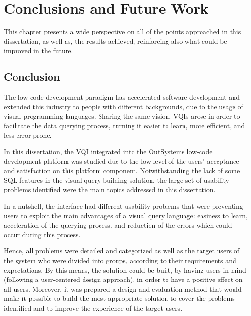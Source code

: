

\chapter{Conclusions and Future Work}
\label{cha:conclusions_and_future_work}

This chapter presents a wide perspective on all of the points approached in this dissertation, as well as, the results achieved, reinforcing also what could be improved in the future.

\section{Conclusion}
\label{sec:conclusion}

The low-code development paradigm has accelerated software development and extended this industry to people with different backgrounds, due to the usage of visual programming languages. Sharing the same vision, \glspl{VQI} arose in order to facilitate the data querying process, turning it easier to learn, more efficient, and less error-prone.

In this dissertation, the \gls{VQI} integrated into the OutSystems low-code development platform was studied due to the low level of the users' acceptance and satisfaction on this platform component. Notwithstanding the lack of some \gls{SQL} features in the visual query building solution, the large set of usability problems identified were the main topics addressed in this dissertation.

In a nutshell, the interface had different usability problems that were preventing users to exploit the main advantages of a visual query language: easiness to learn, acceleration of the querying process, and reduction of the errors which could occur during this process. 

Hence, all problems were detailed and categorized as well as the target users of the system who were divided into groups, according to their requirements and expectations. By this means, the solution could be built, by having users in mind (following a user-centered design approach), in order to have a positive effect on all users. Moreover, it was prepared a design and evaluation method that would make it possible to build the most appropriate solution to cover the problems identified and to improve the experience of the target users.

